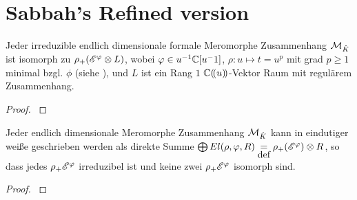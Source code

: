 \section{Sabbah's Refined version}



\begin{prop}
  \cite[Prop 3.1]{sabbah_Fourier-local}
  Jeder irreduzible endlich dimensionale formale Meromorphe Zusammenhang
  $\mathcal{M}_{\hat K}$ ist isomorph zu $\rho_+(\mathscr{E}^\varphi\otimes L)$, wobei $\varphi\in
  u^{-1}\mathbb{C}[u^-1]$, $\rho:u\mapsto t=u^p$ mit grad $p\geq1$ minimal bzgl. $\phi$
  (siehe \cite[Rem 2.8]{sabbah_Fourier-local}), und $L$ ist ein Rang $1$
  ${\mathbb C (\!(u)\!)}$-Vektor Raum mit regulärem Zusammenhang.
\end{prop}
\begin{proof}
  \cite[Prop 3.1]{sabbah_Fourier-local}
\end{proof}

\begin{thm}
  \cite[Cor 3.3]{sabbah_Fourier-local}
  Jeder endlich dimensionale Meromorphe Zusammenhang $\mathcal{M}_{\hat K}$ kann in
  eindutiger weiße geschrieben werden als direkte Summe $\bigoplus
  El(\rho,\varphi,R)\underset{\mbox{def}}{=}\rho_+(\mathscr{E}^\varphi)\otimes R$, so dass
jedes $\rho_+\mathscr{E}^\varphi$ irreduzibel ist und keine zwei $\rho_+\mathscr{E}^\varphi$ isomorph
sind.
\end{thm}
\begin{proof}
  \cite[Cor 3.3]{sabbah_Fourier-local}
\end{proof}


